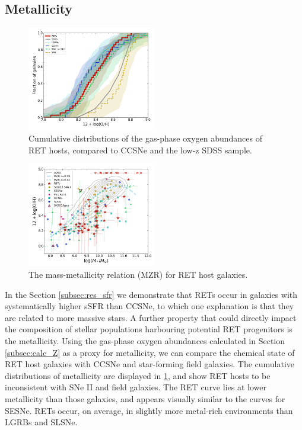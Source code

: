 \documentclass[fleqn,usenatbib,]{mnras}
\begin{document}
\subsection{Metallicity \label{subsec:res_metallicity}}

\begin{figure}
\includegraphics[width=0.5\textwidth]{figs/RET_OH_cum.png}
\caption{Cumulative distributions of the gas-phase oxygen abundances of RET hosts, compared to CCSNe and the low-z SDSS sample.
\label{fig:oh_cum}}
\end{figure}

\begin{figure}
\includegraphics[width=0.5\textwidth]{figs/RET_MZR.png}
\caption{The mass-metallicity relation (MZR) for RET host galaxies.
\label{fig:mzr}}
\end{figure}

In the Section \ref{subsec:res_sfr} we demonstrate that RETs occur in galaxies with systematically higher sSFR than CCSNe, to which one explanation is that they are related to more massive stars. A further property that could directly impact the composition of stellar populations harbouring potential RET progenitors is the metallicity. Using the gas-phase oxygen abundances calculated in Section \ref{subsec:calc_Z} as a proxy for metallicity, we can compare the chemical state of RET host galaxies with CCSNe and star-forming field galaxies. The cumulative distributions of metallicity are displayed in \ref{fig:oh_cum}, and show RET hosts to be inconsistent with SNe II and field galaxies. The RET curve lies at lower metallicity than those galaxies, and appears visually similar to the curves for SESNe. RETs occur, on average, in slightly more metal-rich environments than LGRBs and SLSNe.
\end{document}
